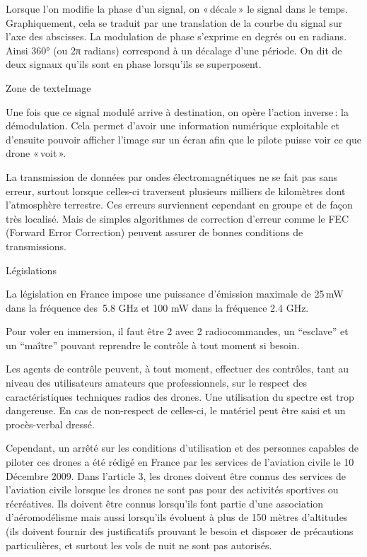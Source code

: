  

Lorsque l’on modifie la phase d’un signal, on « décale » le signal dans le temps. Graphiquement, cela se traduit par une translation de la courbe du signal sur l’axe des abscisses. La modulation de phase s’exprime en degrés ou en radians. Ainsi 360° (ou 2π radians) correspond à un décalage d’une période. On dit de deux signaux qu’ils sont en phase lorsqu’ils se superposent. 

 

Zone de texteImage 

 

 

Une fois que ce signal modulé arrive à destination, on opère l’action inverse : la démodulation. Cela permet d’avoir une information numérique exploitable et d’ensuite pouvoir afficher l’image sur un écran afin que le pilote puisse voir ce que drone « voit ». 

 

La transmission de données par ondes électromagnétiques ne se fait pas sans erreur, surtout lorsque celles-ci traversent plusieurs milliers de kilomètres dont l'atmosphère terrestre. Ces erreurs surviennent cependant en groupe et de façon très localisé. Mais de simples algorithmes de correction d’erreur comme le FEC (Forward Error Correction) peuvent assurer de bonnes conditions de transmissions. 

Législations 

La législation en France impose une puissance d’émission maximale de 25 mW dans la fréquence des  5.8 GHz et 100 mW dans la fréquence 2.4 GHz. 

Pour voler en immersion, il faut être 2 avec 2 radiocommandes, un “esclave” et un “maître” pouvant reprendre le contrôle à tout moment si besoin. 

Les agents de contrôle peuvent, à tout moment, effectuer des contrôles, tant au niveau des utilisateurs amateurs que professionnels, sur le respect des caractéristiques techniques radios des drones. Une utilisation du spectre est trop dangereuse. En cas de non-respect de celles-ci, le matériel peut être saisi et un procès-verbal dressé. 

Cependant, un arrêté sur les conditions d’utilisation et des personnes capables de  piloter ces drones a été rédigé en France par les services de l’aviation civile le 10 Décembre 2009. Dans l’article 3, les drones doivent être connus des services de l’aviation civile lorsque les drones ne sont pas pour des activités sportives ou récréatives. Ils doivent être connus lorsqu’ils font partie d’une association d’aéromodélisme mais aussi lorsqu’ils évoluent à plus de 150 mètres d’altitudes (ils doivent fournir des justificatifs prouvant le besoin et disposer de précautions particulières, et surtout les vols de nuit ne sont pas autorisés. 

